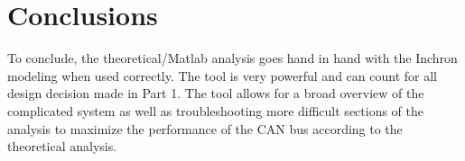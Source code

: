 \section{Conclusions}

To conclude, the theoretical/Matlab analysis goes hand in hand with the Inchron modeling when used correctly. The tool is very powerful and can count for all design decision made in Part 1. The tool allows for a broad overview of the complicated system as well as troubleshooting more difficult sections of the analysis to maximize the performance of the CAN bus according to the theoretical analysis.


